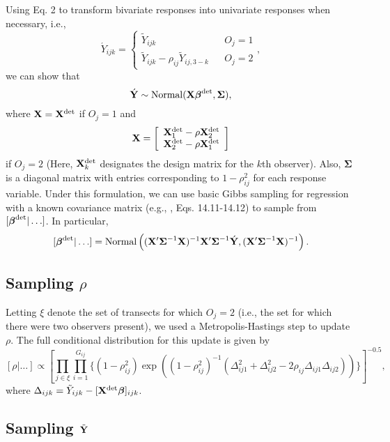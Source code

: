 \documentclass[10pt]{article}
\begin{document}
Using Eq. 2 to transform bivariate responses into univariate responses when necessary, i.e.,
$$
\acute{Y}_{ijk}=
    \left\{ \begin{array}{lll}
				\tilde{Y}_{ijk} & & O_j=1\\
			    \tilde{Y}_{ijk}-\rho_{ij}\tilde{Y}_{ij,3-k} & & O_j=2
		\end{array}, \right.
$$
we can show that
$$
\acute{{\bf Y}} \sim {\rm Normal}({\bf X} \boldsymbol{\beta}^{\rm det},\boldsymbol{\Sigma}),
$$
where ${\bf X}={\bf X}^{\rm det}$ if $O_j=1$ and
$$
{\bf X}=\left[ \begin{array}{l}
    {\bf X}_1^{\rm det} - \rho {\bf X}_2^{\rm det} \\
    {\bf X}_2^{\rm det} - \rho {\bf X}_1^{\rm det}
    \end{array}
    \right]
$$
if $O_j=2$ (Here, ${\bf X}_k^{\rm det}$ designates the design matrix for the $k$th observer).
Also, $\boldsymbol{\Sigma}$ is a diagonal matrix with entries corresponding to $1-\rho_{ij}^2$ for each response variable.  Under this formulation, we can use basic Gibbs sampling for regression with a known covariance matrix (e.g., \cite{GelmanEtAl2004}, Eqs. 14.11-14.12) to sample from $[\boldsymbol{\beta}^{\rm det}|\hdots]$.  In particular,
$$
[\boldsymbol{\beta}^{\rm det}|\hdots]=\textrm{Normal}\left( ({\bf X}^\prime \boldsymbol{\Sigma}^{-1} {\bf X})^{-1}{\bf X}^\prime \boldsymbol{\Sigma}^{-1} \acute{{\bf Y}},
({\bf X}^\prime \boldsymbol{\Sigma}^{-1} {\bf X})^{-1} \right).
$$



\subsection*{Sampling $\rho$}

Letting $\xi$ denote the set of transects for which $O_j=2$ (i.e., the set for which there were two observers present), we used a Metropolis-Hastings step to update $\rho$.  The full conditional distribution for this update is given by
$$
  [\rho|\hdots] \propto \left[ \prod_{j \in \xi} \prod_{i=1}^{G_{ij}}
  \{
(1-\rho_{ij}^2)\exp\left(
(1-\rho_{ij}^2)^{-1} (\Delta_{ij1}^2+\Delta_{ij2}^2-2\rho_{ij}\Delta_{ij1}\Delta_{ij2})
  \right)
  \}
  \right]^{-0.5},
$$
where $\Delta_{ijk}=\tilde{Y}_{ijk}-[{\bf X}^{\rm det} \boldsymbol{\beta}]_{ijk}$.

\subsection*{Sampling $\tilde{\bf Y}$}
\end{document}
